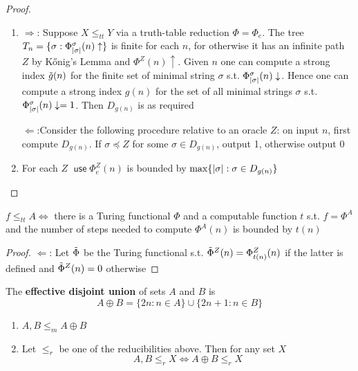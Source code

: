 \documentclass[11pt]{article}
\DeclareMathOperator{\use}{\textsf{use}}
\begin{document}
\begin{proof}
\begin{enumerate}
\item \(\Rightarrow\): Suppose \(X\le_{tt}Y\) via a truth-table reduction \(\Phi=\Phi_e\). The
tree \(T_n=\{\sigma:\Phi^\sigma_{\abs{\sigma}}(n)\uparrow\}\) is finite for each \(n\), for otherwise it has an infinite
path \(Z\) by Kőnig's Lemma and \(\Phi^Z(n)\uparrow\). Given \(n\) one can compute a strong
index \(\tilde{g}(n)\) for the finite set of minimal string \(\sigma\) s.t. \(\Phi_{\abs{\sigma}}^\sigma(n)\downarrow\). Hence
one can compute a strong index \(g(n)\) for the set of all minimal strings \(\sigma\)
s.t. \(\Phi_{\abs{\sigma}}^\sigma(n)\downarrow=1\). Then \(D_{g(n)}\) is as required

\(\Leftarrow\):Consider the following procedure relative to an oracle \(Z\): on input \(n\), first
compute \(D_{g(n)}\). If \(\sigma\preceq Z\) for some \(\sigma\in D_{g(n)}\), output 1, otherwise output 0

\item For each \(Z\) \(\use\Phi_e^Z(n)\) is bounded by \(\max\{\abs{\sigma}:\sigma\in D_{g(n)}\}\)
\end{enumerate}
\end{proof}

\begin{proposition}[]
\(f\le_{tt}A\Leftrightarrow\) there is a Turing functional \(\Phi\) and a computable function \(t\) s.t. \(f=\Phi^A\) and
the number of steps needed to compute \(\Phi^A(n)\) is bounded by \(t(n)\)
\end{proposition}

\begin{proof}
\(\Leftarrow\): Let \(\tilde{\Phi}\) be the Turing functional s.t. \(\tilde{\Phi}^Z(n)=\Phi^Z_{t(n)}(n)\) if the
latter is defined and \(\tilde{\Phi}^Z(n)=0\) otherwise
\end{proof}

\begin{definition}[]
The \textbf{effective disjoint union} of sets \(A\) and \(B\) is
\begin{equation*}
A\oplus B=\{2n:n\in A\}\cup\{2n+1:n\in B\}
\end{equation*}
\end{definition}

\begin{exercise}
\label{1.2.23}
\begin{enumerate}
\item \(A,B\le_mA\oplus B\)
\item Let \(\le_r\) be one of the reducibilities above. Then for any set \(X\)
\begin{equation*}
A,B\le_rX\Leftrightarrow A\oplus B\le_rX
\end{equation*}
\end{enumerate}
\end{exercise}
\end{document}
